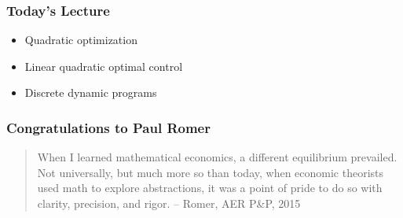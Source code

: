 

\subtitle{Lecture 10}

\author{John Stachurski}


\date{Fall Semester 2018}





\begin{frame}
  \titlepage
\end{frame}



\begin{frame}
    \frametitle{Today's Lecture}

    \begin{itemize}
        \item Quadratic optimization
        \vspace{0.5em}
        \vspace{0.5em}
        \item Linear quadratic optimal control
        \vspace{0.5em}
        \vspace{0.5em}
        \item Discrete dynamic programs
    \end{itemize}

\end{frame}



\begin{frame}
    \frametitle{Congratulations to Paul Romer}

    \begin{quote}
        When I learned mathematical economics, a
        different equilibrium prevailed. Not universally,
        but much more so than today, when economic
        theorists used math to explore abstractions,
        it was a point of pride to do so with clarity,
        precision, and rigor. -- \textsf{Romer, AER P\&P, 2015}
	\end{quote}

\end{frame}


